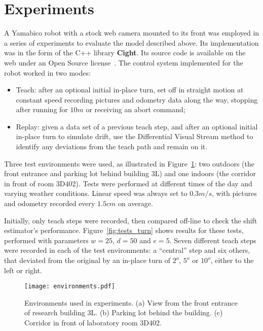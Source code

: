 \documentclass[twocolumn, 9pt,fleqn]{jsproceedings}
\begin{document}
\section{Experiments}

A Yamabico robot with a stock web camera mounted to its front was employed in a series of experiments to evaluate the model described above. Its implementation was in the form of the C++ library \textbf{Cight}. Its source code is available on the web under an Open Source license~\cite{HEL14c}. The control system implemented for the robot worked in two modes:

\begin{itemize}
\item Teach: after an optional initial in-place turn, set off in straight motion at constant speed recording pictures and odometry data along the way, stopping after running for $10m$ or receiving an abort command;
\item Replay: given a data set of a previous teach step, and after an optional initial in-place turn to simulate drift, use the Differential Visual Stream method to identify any deviations from the teach path and remain on it.
\end{itemize}

Three test environments were used, as illustrated in Figure~\ref{fig:environments}: two outdoors (the front entrance and parking lot behind building 3L) and one indoors (the corridor in front of room 3D402). Tests were performed at different times of the day and varying weather conditions. Linear speed was always set to $0.3m/s$, with pictures and odometry recorded every $1.5cm$ on average.

Initially, only teach steps were recorded, then compared off-line to check the shift estimator's performance. Figure~\ref{fig:tests_turn} shows results for these tests, performed with parameters $w = 25$, $d = 50$ and $e = 5$. Seven different teach steps were recorded in each of the test environments: a ``central'' step and six others, that deviated from the original by an in-place turn of $2^o$, $5^o$ or $10^o$, either to the left or right.

\begin{figure}[h!]
\texttt{[image: environments.pdf]}
\caption{Environments used in experiments. (a) View from the front entrance of research building 3L. (b) Parking lot behind the building. (c) Corridor in front of laboratory room 3D402.}
\label{fig:environments}
\end{figure}
\end{document}

